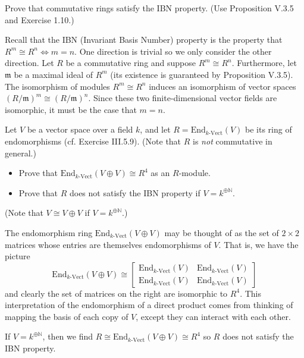 \documentclass[../../master.tex]{subfiles}
\begin{document}
\begin{problem}
    Prove that commutative rings satisfy the IBN property.
    (Use Proposition V.3.5 and Exercise 1.10.)
\end{problem}

\begin{solution}
    Recall that the IBN (Invariant Basis Number) property is the property that $R^{m} \cong R^{n} \Longleftrightarrow m = n$.
    One direction is trivial so we only consider the other direction.
    Let $R$ be a commutative ring and suppose $R^{m} \cong R^{n}$.
    Furthermore, let $\mathfrak{m}$ be a maximal ideal of $R^{m}$ (its existence is guaranteed by Proposition V.3.5).
    The isomorphism of modules $R^{m} \cong R^{n}$ induces an isomorphism of vector spaces $(R / \mathfrak{m})^{m} \cong (R / \mathfrak{m})^{n}$.
    Since these two finite-dimensional vector fields are isomorphic, it must be the case that $m = n$.
\end{solution}

\begin{problem}
    Let $V$ be a vector space over a field $k$, and let $R = \text{End}_{k\text{-Vect}}(V)$ be its ring of endomorphisms (cf. Exercise III.5.9).
    (Note that $R$ is \textit{not} commutative in general.)
    \begin{itemize}
        \item Prove that $\text{End}_{k\text{-Vect}}(V \oplus V) \cong R^{4}$ as an $R$-module.
        \item Prove that $R$ does not satisfy the IBN property if $V = k^{\oplus \mathbb{N}}$.
    \end{itemize}
    (Note that $V \cong V \oplus V$ if $V = k^{\oplus \mathbb{N}}$.)
\end{problem}

\begin{solution}
    The endomorphism ring $\text{End}_{k \text{-Vect}} (V \oplus V)$ may be thought of as the set of $2 \times 2$ matrices whose entries are themselves endomorphisms of $V$.
    That is, we have the picture
    \[
        \text{End}_{k \text{-Vect}} (V \oplus V) \cong
        \begin{bmatrix}
            \text{End}_{k \text{-Vect}} (V) & \text{End}_{k \text{-Vect}} (V) \\
            \text{End}_{k \text{-Vect}} (V) & \text{End}_{k \text{-Vect}} (V)
        \end{bmatrix}
    \]
    and clearly the set of matrices on the right are isomorphic to $R^{4}$.
    This interpretation of the endomorphism of a direct product comes from thinking of mapping the basis of each copy of $V$, except they can interact with each other.

    If $V = k^{\oplus \mathbb{N}}$, then we find $R \cong \text{End}_{k \text{-Vect}} (V \oplus V) \cong R^{4}$ so $R$ does not satisfy the IBN property.
\end{solution}
\end{document}

